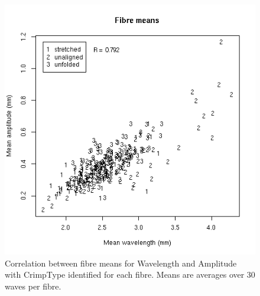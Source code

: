 %

\begin{figure}[!h]
  \centering
  \includegraphics[width=1.0\textwidth]{figsffibremeans.png}
  \caption{Correlation between fibre means for Wavelength and Amplitude with CrimpType identified for each fibre. Means are averages over 30 waves per fibre.}
  \label{fig:sffibremeans}
\end{figure}

%

